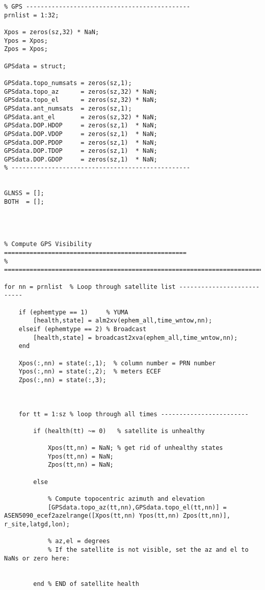 \documentclass[12pt,a4paper,oneside]{article}
\begin{document}
\begin{appendix}
\begin{lstlisting}
% GPS ---------------------------------------------
prnlist = 1:32;

Xpos = zeros(sz,32) * NaN;
Ypos = Xpos;
Zpos = Xpos;

GPSdata = struct;

GPSdata.topo_numsats = zeros(sz,1);
GPSdata.topo_az      = zeros(sz,32) * NaN;
GPSdata.topo_el      = zeros(sz,32) * NaN;
GPSdata.ant_numsats  = zeros(sz,1);
GPSdata.ant_el       = zeros(sz,32) * NaN;
GPSdata.DOP.HDOP     = zeros(sz,1)  * NaN;
GPSdata.DOP.VDOP     = zeros(sz,1)  * NaN;
GPSdata.DOP.PDOP     = zeros(sz,1)  * NaN;
GPSdata.DOP.TDOP     = zeros(sz,1)  * NaN;
GPSdata.DOP.GDOP     = zeros(sz,1)  * NaN;
% -------------------------------------------------


GLNSS = [];
BOTH  = [];




% Compute GPS Visibility ==================================================
% =========================================================================

for nn = prnlist  % Loop through satellite list ---------------------------
    
    if (ephemtype == 1)     % YUMA
        [health,state] = alm2xv(ephem_all,time_wntow,nn);
    elseif (ephemtype == 2) % Broadcast
        [health,state] = broadcast2xva(ephem_all,time_wntow,nn);
    end

    Xpos(:,nn) = state(:,1);  % column number = PRN number
    Ypos(:,nn) = state(:,2);  % meters ECEF
    Zpos(:,nn) = state(:,3);

        
    
    for tt = 1:sz % loop through all times ------------------------
    
        if (health(tt) ~= 0)   % satellite is unhealthy
            
            Xpos(tt,nn) = NaN; % get rid of unhealthy states
            Ypos(tt,nn) = NaN;
            Zpos(tt,nn) = NaN;
        
        else
            
            % Compute topocentric azimuth and elevation
            [GPSdata.topo_az(tt,nn),GPSdata.topo_el(tt,nn)] = ASEN5090_ecef2azelrange([Xpos(tt,nn) Ypos(tt,nn) Zpos(tt,nn)], r_site,latgd,lon);
    
            % az,el = degrees
            % If the satellite is not visible, set the az and el to NaNs or zero here:
            
                
        end % END of satellite health
        

\end{lstlisting}
\end{appendix}
\end{document}
